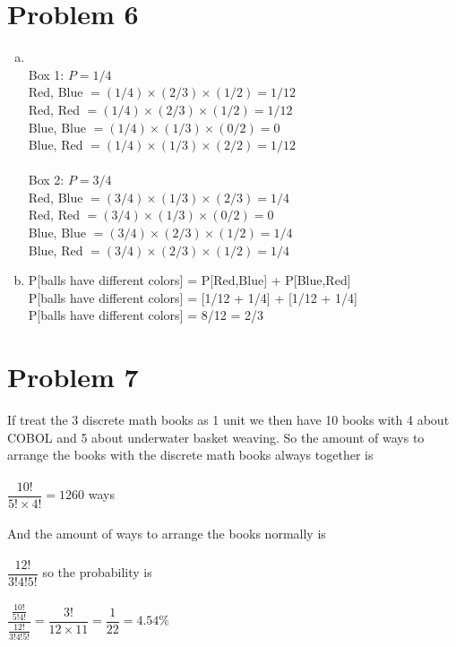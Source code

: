 \documentclass[11pt,letterpaper]{article}
\begin{document}
\clearpage
\section*{Problem 6}
\begin{enumerate}[(a)]
\item
~\\
Box 1: $P = 1/4$\\
Red, Blue $= (1/4)\times(2/3)\times(1/2) = 1/12$\\
Red, Red $=(1/4)\times(2/3)\times(1/2) = 1/12$\\
Blue, Blue $=(1/4)\times(1/3)\times(0/2) = 0$\\
Blue, Red $=(1/4)\times(1/3)\times(2/2) = 1/12$\\
\\
Box 2: $P=3/4$\\
Red, Blue $= (3/4)\times(1/3)\times(2/3) = 1/4$\\
Red, Red $= (3/4)\times(1/3)\times(0/2) = 0$\\
Blue, Blue $= (3/4)\times(2/3)\times(1/2) = 1/4$\\
Blue, Red $= (3/4)\times(2/3)\times(1/2) = 1/4$\\
\item
P[balls have different colors] = P[Red,Blue] + P[Blue,Red]\\
P[balls have different colors] = [1/12 + 1/4] + [1/12 + 1/4]\\
P[balls have different colors] = 8/12 = 2/3
\end{enumerate}
\clearpage
\section*{Problem 7}
If treat the 3 discrete math books as 1 unit we then have 10 books with 4 about COBOL and 5 about underwater basket weaving. So the amount of ways to arrange the books with the discrete math books always together is\\\\
$\dfrac{10!}{5!\times 4!} = 1260$ ways\\\\
And the amount of ways to arrange the books normally is \\\\
$\dfrac{12!}{3!4!5!}$ so the probability is\\\\


$\dfrac{\frac{10!}{5!4!}}{\frac{12!}{3!4!5!}} = \dfrac{3!}{12\times11} = \dfrac{1}{22}=4.54 \%$
\end{document}
